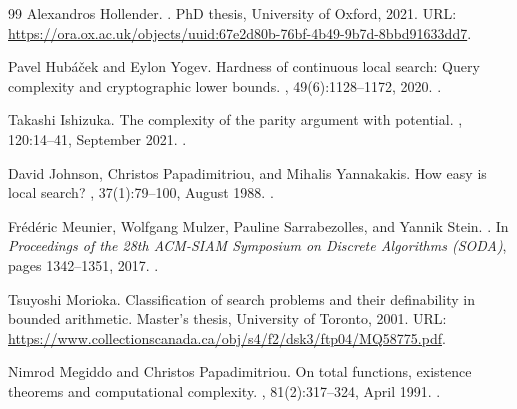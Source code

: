 \begin{thebibliography}{99}
Alexandros Hollender.
.
\newblock PhD thesis, University of Oxford, 2021.
\newblock URL:
  \url{https://ora.ox.ac.uk/objects/uuid:67e2d80b-76bf-4b49-9b7d-8bbd91633dd7}.

Pavel Hub{\'{a}}{\v{c}}ek and Eylon Yogev.
\newblock Hardness of continuous local search: Query complexity and
  cryptographic lower bounds.
, 49(6):1128--1172, 2020.
\newblock \href {https://doi.org/10.1137/17m1118014}
  {}.

Takashi Ishizuka.
\newblock The complexity of the parity argument with potential.
, 120:14--41, September
  2021.
\newblock \href {https://doi.org/10.1016/j.jcss.2021.03.004}
  {}.

David Johnson, Christos Papadimitriou, and Mihalis Yannakakis.
\newblock How easy is local search?
, 37(1):79--100, August
  1988.
\newblock \href {https://doi.org/10.1016/0022-0000(88)90046-3}
  {}.

Fr{\'e}d{\'e}ric Meunier, Wolfgang Mulzer, Pauline Sarrabezolles, and Yannik
  Stein.
.
\newblock In {\em Proceedings of the 28th ACM-SIAM Symposium on Discrete
  Algorithms (SODA)}, pages 1342--1351, 2017.
\newblock \href {https://doi.org/10.1137/1.9781611974782.87}
  {}.

Tsuyoshi Morioka.
\newblock Classification of search problems and their definability in bounded
  arithmetic.
\newblock Master's thesis, University of Toronto, 2001.
\newblock URL:
  \url{https://www.collectionscanada.ca/obj/s4/f2/dsk3/ftp04/MQ58775.pdf}.

Nimrod Megiddo and Christos Papadimitriou.
\newblock On total functions, existence theorems and computational complexity.
, 81(2):317--324, April 1991.
\newblock \href {https://doi.org/10.1016/0304-3975(91)90200-L}
  {}.


\end{thebibliography}

